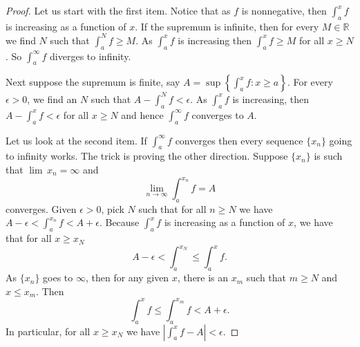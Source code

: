 \documentclass[12pt]{book}
\newcommand{\abs}[1]{\left\lvert {#1} \right\rvert}
\newcommand{\R}{{\mathbb{R}}}
\newcommand{\N}{{\mathbb{N}}}
\theoremstyle{plain}
\theoremstyle{remark}
\theoremstyle{definition}
\theoremstyle{exercise}
\theoremstyle{example}
\begin{document}
\begin{proof}
Let us start with the first item.
Notice that as $f$ is nonnegative,
then $\int_a^x f$ is increasing as a function of $x$.
If the supremum is infinite, then for every $M \in \R$
we find $N$ such that $\int_a^N f \geq M$.  As $\int_a^x f$
is increasing then $\int_a^x f \geq M$ for all $x \geq N$.  So
$\int_a^\infty f$ diverges to infinity.

Next suppose the supremum is finite, say
$A = \sup \left\{ \int_a^x f : x \geq a \right\}$.
For every $\epsilon > 0$, we find an $N$ such that
$A - \int_a^N f < \epsilon$.  As $\int_a^x f$ is increasing,
then
$A - \int_a^x f < \epsilon$ for all $x \geq N$ and hence
$\int_a^\infty f$ converges to $A$.

Let us look at the second item.
If $\int_a^\infty f$ converges then every sequence $\{ x_n \}$ going to
infinity works.  The trick is
proving the other direction.  Suppose $\{ x_n \}$ is such that $\lim\, x_n =
\infty$ and
\begin{equation*}
\lim_{n\to\infty} \int_a^{x_n} f = A
\end{equation*}
converges.  Given $\epsilon > 0$, pick $N$ such that for
all $n \geq N$ we have
$A - \epsilon < \int_a^{x_n} f < A + \epsilon$.
Because $\int_a^x f$ is increasing as a function of $x$, we have that for all
$x \geq x_N$
\begin{equation*}
A - \epsilon < \int_a^{x_N} \leq \int_a^x f .
\end{equation*}
As $\{ x_n \}$ goes to $\infty$, then for any given
$x$, there is an $x_m$ such that $m \geq N$ and $x \leq x_m$.  Then
\begin{equation*}
\int_a^{x} f \leq \int_a^{x_m} f < A + \epsilon .
\end{equation*}
In particular, for all $x \geq x_N$ we have
$\abs{\int_a^{x} f - A} < \epsilon$.
\end{proof}
\end{document}
